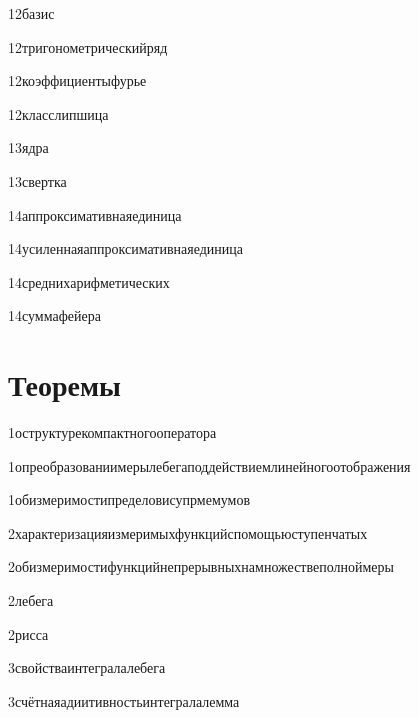 {12}{базис}

{12}{тригонометрическийряд}

{12}{коэффициентыфурье}

{12}{класслипшица}

{13}{ядра}

{13}{свертка}

{14}{аппроксимативнаяединица}

{14}{усиленнаяаппроксимативнаяединица}

{14}{среднихарифметических}

{14}{суммафейера}


\section{Теоремы}

{1}{оструктурекомпактногооператора}

{1}{опреобразованиимерылебегаподдействиемлинейногоотображения}

{1}{обизмеримостипределовисупрмемумов}

{2}{характеризацияизмеримыхфункцийспомощьюступенчатых}

{2}{обизмеримостифункцийнепрерывныхнамножествеполноймеры}

{2}{лебега}

{2}{рисса}

{3}{свойстваинтегралалебега}

{3}{счётнаяадиитивностьинтегралалемма}

